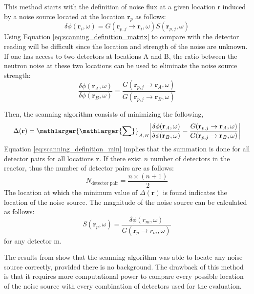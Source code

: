 This method starts with the definition of noise flux at a given location r induced by a noise source located at the location $\textbf{r}_p$ as follows:
\begin{equation}
    \delta \phi (\textbf{r}_i,\omega) = G(\textbf{r}_{p,j} \rightarrow \textbf{r}_i, \omega) S(\textbf{r}_{p,j}, \omega)
    \label{eq:scanning_definition_matrix}
\end{equation}
Using Equation \ref{eq:scanning_definition_matrix} to compare with the detector reading will be difficult since the location and strength of the noise are unknown. If one has access to two detectors at locations A and B, the ratio between the neutron noise at these two locations can be used to eliminate the noise source strength:
\begin{equation}
    \frac{\delta \phi (\textbf{r}_A,\omega)}{\delta \phi (\textbf{r}_B,\omega)} = \frac{G(\textbf{r}_{p,j} \rightarrow \textbf{r}_A, \omega)}{G(\textbf{r}_{p,j} \rightarrow \textbf{r}_B, \omega)}
    \label{eq:scanning_definition_frac}
\end{equation}

Then, the scanning algorithm consists of minimizing the following,
\begin{equation}
    \Delta(\textbf{r}) = \mathlarger{\mathlarger{\sum}}_{A,B} \biggl| \frac{\delta \phi (\textbf{r}_A,\omega)}{\delta \phi (\textbf{r}_B,\omega)} - \frac{G(\textbf{r}_{p,j} \rightarrow \textbf{r}_A, \omega)}{G(\textbf{r}_{p,j} \rightarrow \textbf{r}_B, \omega)} \biggr|
    \label{eq:scanning_definition_min}
\end{equation}
Equation \ref{eq:scanning_definition_min} implies that the summation is done for all detector pairs for all locations $\textbf{r}$. If there exist $n$ number of detectors in the reactor, thus the number of detector pairs are as follows:
\begin{equation}
    N_{\text{detector pair}} = \frac{n \times (n+1)}{2}
\end{equation}
The location at which the minimum value of $\Delta(\textbf{r})$ is found indicates the location of the noise source. The magnitude of the noise source can be calculated as follows:
\begin{equation}
    S(\textbf{r}_p,\omega) = \frac{\delta \phi(r_m,\omega)}{G(\textbf{r}_{p} \rightarrow r_m, \omega)}
\end{equation}
for any detector m.

The results from \cite{demaziereDevelopmentNoisebasedMethod2002} show that the scanning algorithm was able to locate any noise source correctly, provided there is no background. The drawback of this method is that it requires more computational power to compare every possible location of the noise source with every combination of detectors used for the evaluation.



